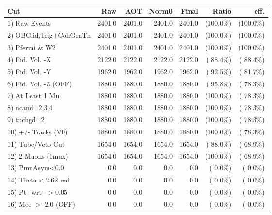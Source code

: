  \begin{table}[h!]\centering
 \begin{tabular}{||l||r|r|r|r|r|r||}
 \hline
 \hline
 Cut & Raw & AOT & Norm0 & Final & Ratio & eff.       \\
 \hline
  1) Raw Events           &       2401.0 &       2401.0 &       2401.0 &       2401.0 & (100.0\%) & (100.0\%) \\
  2) OBGfid,Trig+CohGenTh &       2401.0 &       2401.0 &       2401.0 &       2401.0 & (100.0\%) & (100.0\%) \\
  3) Pfermi \& W2         &       2401.0 &       2401.0 &       2401.0 &       2401.0 & (100.0\%) & (100.0\%) \\
  4) Fid. Vol. -X         &       2122.0 &       2122.0 &       2122.0 &       2122.0 & ( 88.4\%) & ( 88.4\%) \\
  5) Fid. Vol. -Y         &       1962.0 &       1962.0 &       1962.0 &       1962.0 & ( 92.5\%) & ( 81.7\%) \\
  6) Fid. Vol. -Z (OFF)   &       1880.0 &       1880.0 &       1880.0 &       1880.0 & ( 95.8\%) & ( 78.3\%) \\
  7) At Least 1 Mu        &       1880.0 &       1880.0 &       1880.0 &       1880.0 & (100.0\%) & ( 78.3\%) \\
  8) ncand=2,3,4          &       1880.0 &       1880.0 &       1880.0 &       1880.0 & (100.0\%) & ( 78.3\%) \\
  9) tnchgd=2             &       1880.0 &       1880.0 &       1880.0 &       1880.0 & (100.0\%) & ( 78.3\%) \\
 10) +/- Tracks (V0)      &       1880.0 &       1880.0 &       1880.0 &       1880.0 & (100.0\%) & ( 78.3\%) \\
 11) Tube/Veto Cut        &       1654.0 &       1654.0 &       1654.0 &       1654.0 & ( 88.0\%) & ( 68.9\%) \\
 12) 2 Muons (1mux)       &       1654.0 &       1654.0 &       1654.0 &       1654.0 & (100.0\%) & ( 68.9\%) \\
 13) PmuAsym<0.0          &          0.0 &          0.0 &          0.0 &          0.0 & (  0.0\%) & (  0.0\%) \\
 14) Theta$<$2.62 rad     &          0.0 &          0.0 &          0.0 &          0.0 & (  0.0\%) & (  0.0\%) \\
 15) Pt+wrt- $>$0.05      &          0.0 &          0.0 &          0.0 &          0.0 & (  0.0\%) & (  0.0\%) \\
 16) Mee $>$ 2.0  (OFF)   &          0.0 &          0.0 &          0.0 &          0.0 & (  0.0\%) & (  0.0\%) \\

\end{tabular}
\end{table}
